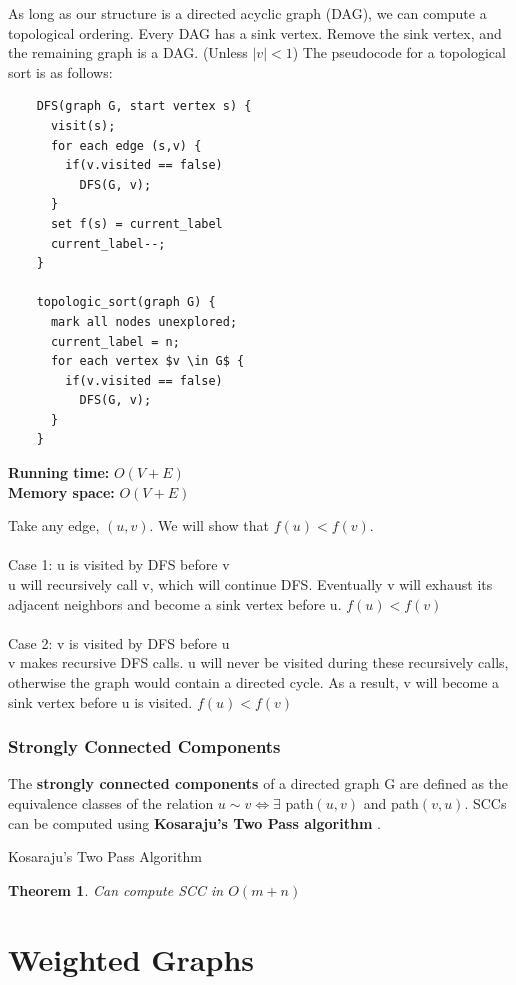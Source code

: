 \documentclass[]{book}
\makeatletter
\renewenvironment{proof}[1][\proofname] {\par\pushQED{\qed}\normalfont\topsep6\p@\@plus6\p@\relax\trivlist\item[\hskip\labelsep\bfseries#1\@addpunct{.}]\ignorespaces}{\popQED\endtrivlist\@endpefalse}
\newcommand{\runtime}{\textbf{Running time:}}
\newcommand{\memory}{\textbf{Memory space:}}
\makeatother
\begin{document}
  As long as our structure is a directed acyclic graph (DAG), we can compute a topological ordering.
  Every DAG has a sink vertex. Remove the sink vertex, and the remaining graph is a DAG. (Unless
  $|v| < 1$) The pseudocode for a topological sort is as follows:
  \begin{Verbatim}
    DFS(graph G, start vertex s) {
      visit(s);
      for each edge (s,v) {
        if(v.visited == false)
          DFS(G, v);
      }
      set f(s) = current_label
      current_label--;
    }

    topologic_sort(graph G) {
      mark all nodes unexplored;
      current_label = n;
      for each vertex $v \in G$ {
        if(v.visited == false)
          DFS(G, v);
      }
    }
  \end{Verbatim}
  \runtime{} $O(V+E)$\\
  \memory{} $O(V+E)$
  \begin{proof}
    Take any edge, $(u,v)$. We will show that $f(u) < f(v)$.\\\\
    \indent Case 1: u is visited by DFS before v\\
    u will recursively call v, which will continue DFS. Eventually v will exhaust
    its adjacent neighbors and become a sink vertex before u. $f(u) < f(v)$\\\\
    \indent Case 2: v is visited by DFS before u\\
    v makes recursive DFS calls. u will never be visited during these recursively calls,
    otherwise the graph would contain a directed cycle. As a result, v will become a sink
    vertex before u is visited. $f(u) < f(v)$
  \end{proof}

  \subsection*{Strongly Connected Components}
  The \textbf{strongly connected components} of a directed graph G are defined
  as the equivalence classes of the relation $u\sim v \Leftrightarrow \exists$ path$(u,v)$ and
  path$(v,u)$. SCCs can be computed using \textbf{Kosaraju's Two Pass algorithm}
  .

  Kosaraju's Two Pass Algorithm
  \newtheorem{Kosaraju}{Theorem}[section]
  \begin{Kosaraju}
    Can compute SCC in $O(m+n)$
  \end{Kosaraju}
  \chapter{Weighted Graphs}
\end{document}
